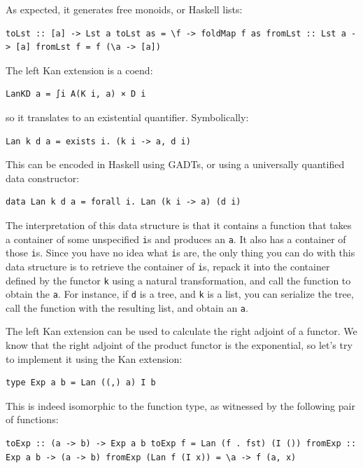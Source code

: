 As expected, it generates free monoids, or Haskell lists:

\begin{verbatim}
toLst :: [a] -> Lst a toLst as = \f -> foldMap f as fromLst :: Lst a -> [a] fromLst f = f (\a -> [a])
\end{verbatim}

The left Kan extension is a coend:

\begin{verbatim}
LanKD a = ∫i A(K i, a) × D i
\end{verbatim}

so it translates to an existential quantifier. Symbolically:

\begin{verbatim}
Lan k d a = exists i. (k i -> a, d i)
\end{verbatim}

This can be encoded in Haskell using GADTs, or using a universally
quantified data constructor:

\begin{verbatim}
data Lan k d a = forall i. Lan (k i -> a) (d i)
\end{verbatim}

The interpretation of this data structure is that it contains a function
that takes a container of some unspecified \texttt{i}s and produces an
\texttt{a}. It also has a container of those \texttt{i}s. Since you have
no idea what \texttt{i}s are, the only thing you can do with this data
structure is to retrieve the container of \texttt{i}s, repack it into
the container defined by the functor \texttt{k} using a natural
transformation, and call the function to obtain the \texttt{a}. For
instance, if \texttt{d} is a tree, and \texttt{k} is a list, you can
serialize the tree, call the function with the resulting list, and
obtain an \texttt{a}.

The left Kan extension can be used to calculate the right adjoint of a
functor. We know that the right adjoint of the product functor is the
exponential, so let's try to implement it using the Kan extension:

\begin{verbatim}
type Exp a b = Lan ((,) a) I b
\end{verbatim}

This is indeed isomorphic to the function type, as witnessed by the
following pair of functions:

\begin{verbatim}
toExp :: (a -> b) -> Exp a b toExp f = Lan (f . fst) (I ()) fromExp :: Exp a b -> (a -> b) fromExp (Lan f (I x)) = \a -> f (a, x)
\end{verbatim}

